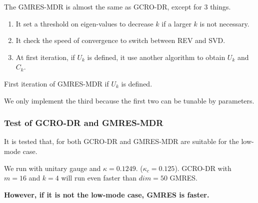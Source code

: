 The GMRES-MDR is almost the same as GCRO-DR, except for $3$ things.

\begin{enumerate}
  \item It set a threshold on eigen-values to decrease $k$ if a larger $k$ is not necessary.
  \item It check the speed of convergence to switch between REV and SVD.
  \item At first iteration, if $U_k$ is defined, it use another algorithm to obtain $U_k$ and $C_k$.
\end{enumerate}

\begin{algorithm}[H]
\begin{algorithmic}
\EndIf
{}
\EndIf
{}
\EndIf
{}
\end{algorithmic}
\caption{First iteration of GMRES-MDR if $U_k$ is defined.}
\end{algorithm}

We only implement the third because the first two can be tunable by parameters.

\subsubsection{\label{sec:testofgcrodr}Test of GCRO-DR and GMRES-MDR}

It is tested that, for both GCRO-DR and GMRES-MDR are suitable for the low-mode case.

We run with unitary gauge and $\kappa = 0.1249$. ($\kappa_c=0.125$). GCRO-DR with $m=16$ and $k=4$ will run even faster than $dim=50$ GMRES.

\textbf{However, if it is not the low-mode case, GMRES is faster.}

